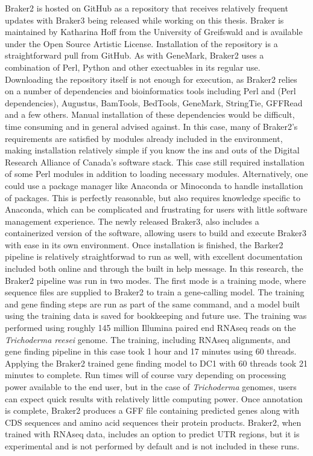 Braker2\cite{Bruna2021} is hosted on GitHub as a repository that
receives relatively frequent updates with Braker3 being released while
working on this thesis. Braker is maintained by Katharina Hoff from
the University of Greifswald and is available under the Open Source
Artistic License. Installation of the repository is a straightforward
pull from GitHub. As with GeneMark, Braker2 uses a combination of
Perl, Python and other exectuables in its regular use. Downloading the
repository itself is not enough for execution, as Braker2 relies on a
number of dependencies and bioinformatics tools including Perl and
(Perl dependencies), Augustus, BamTools, BedTools, GeneMark,
StringTie, GFFRead and a few others. Manual installation of these
dependencies would be difficult, time consuming and in general advised
against. In this case, many of Braker2's requirements are satisfied by
modules already included in the environment, making installation
relatively simple if you know the ins and outs of the Digital Research
Alliance of Canada's software stack. This case still required
installation of some Perl modules in addition to loading necessary
modules. Alternatively, one could use a package manager like Anaconda
or Minoconda to handle installation of packages. This is perfectly
reasonable, but also requires knowledge specific to Anaconda, which
can be complicated and frustrating for users with little software
management experience. The newly released Braker3, also includes a
containerized version of the software, allowing users to build and
execute Braker3 with ease in its own environment. Once installation is
finished, the Barker2 pipeline is relatively straightforwad to run as
well, with excellent documentation included both online and through
the built in help message. In this research, the Braker2 pipeline was
run in two modes. The first mode is a training mode, where sequence
files are supplied to Braker2 to train a gene-calling model. The
training and gene finding steps are run as part of the same command,
and a model built using the training data is saved for bookkeeping and
future use. The training was performed using roughly 145 million
Illumina paired end RNAseq reads on the \textit{Trichoderma reesei}
genome. The training, including RNAseq alignments, and gene finding
pipeline in this case took 1 hour and 17 minutes using 60
threads. Applying the Braker2 trained gene finding model to DC1 with
60 threads took 21 minutes to complete. Run times will of course vary
depending on processing power available to the end user, but in the
case of \textit{Trichoderma} genomes, users can expect quick results
with relatively little computing power. Once annotation is complete,
Braker2 produces a GFF file containing predicted genes along with CDS
sequences and amino acid sequences their protein products. Braker2,
when trained with RNAseq data, includes an option to predict UTR
regions, but it is experimental and is not performed by default and is
not included in these runs.


